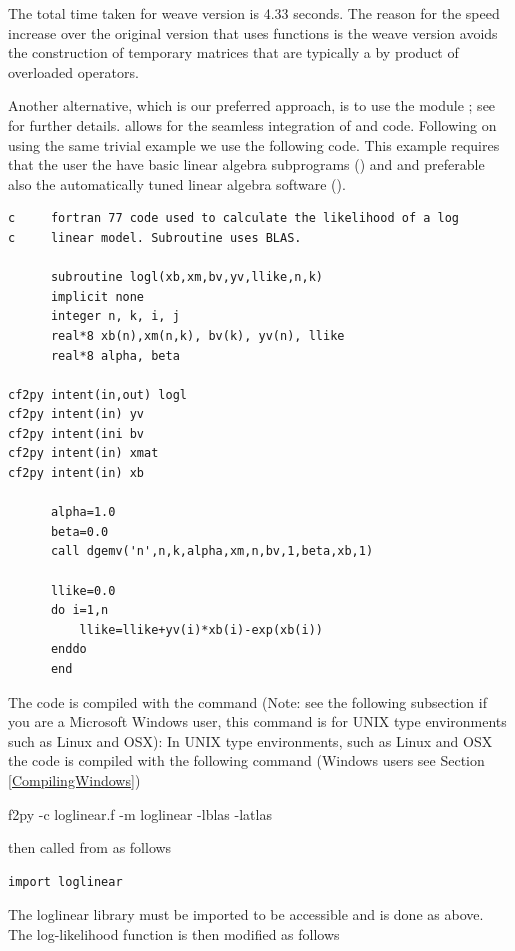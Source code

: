 \documentclass[article]{jss}
\begin{document}
The total time taken for weave version is 4.33 seconds. The reason for
the speed increase over the original version that uses 
functions is the weave version avoids the construction of temporary
matrices that are typically a by product of overloaded operators.

Another alternative, which is our preferred approach, is to use the
 module ; see \citet{F2PY} for further
details.  allows for the seamless integration of
 and  code. Following on using the
same trivial example we use the following  code.
This example requires that the user the have basic linear algebra
subprograms () and and preferable also the automatically
tuned
linear algebra software ().\\
 
\begin{lstlisting}[basicstyle={\scriptsize}]
c     fortran 77 code used to calculate the likelihood of a log
c     linear model. Subroutine uses BLAS.

      subroutine logl(xb,xm,bv,yv,llike,n,k)
      implicit none
      integer n, k, i, j
      real*8 xb(n),xm(n,k), bv(k), yv(n), llike
      real*8 alpha, beta

cf2py intent(in,out) logl
cf2py intent(in) yv
cf2py intent(ini bv
cf2py intent(in) xmat 
cf2py intent(in) xb 

      alpha=1.0
      beta=0.0
      call dgemv('n',n,k,alpha,xm,n,bv,1,beta,xb,1)

      llike=0.0
      do i=1,n
          llike=llike+yv(i)*xb(i)-exp(xb(i))
      enddo
      end
\end{lstlisting}


The code is compiled with the command (Note: see the following
subsection if you are a Microsoft Windows user, this command is for
UNIX type environments such as Linux and OSX): In UNIX type
environments, such as Linux and OSX the code is compiled with the
following command (Windows users see Section \ref{CompilingWindows})

f2py -c loglinear.f -m loglinear -lblas -latlas

then called from  as follows


\begin{lstlisting}[basicstyle={\scriptsize}]
import loglinear
\end{lstlisting}


The loglinear library must be imported to be accessible and is done as
above. The log-likelihood function is then modified as follows
\end{document}
